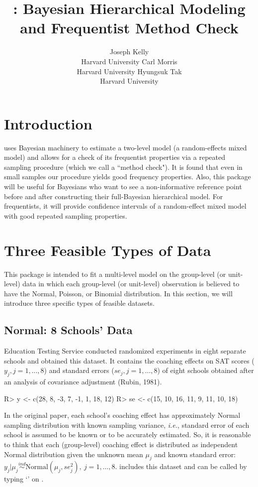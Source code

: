 \documentclass[article]{jss}
\author{Joseph Kelly\\Harvard University \And 
             Carl Morris\\ Harvard University\And
             Hyungsuk Tak\\Harvard University }
\title{\pkg{Rgbp}: Bayesian Hierarchical Modeling and Frequentist Method Check}
\begin{document}

\section[introduction]{Introduction}
 uses Bayesian machinery to estimate a two-level model (a random-effects mixed model) and allows for a check of its frequentist properties via a repeated sampling procedure (which we call a ``method check"). It is found that even in small samples our procedure yields good frequency properties. Also, this package will be useful for Bayesians who want to see a non-informative reference point before and after constructing their full-Bayesian hierarchical model. For frequentists, it will provide confidence intervals of a random-effect mixed model with good repeated sampling properties.

\section[Feasible Data Types]{Three Feasible Types of Data }
This package is intended to fit a multi-level model on the group-level (or unit-level) data in which each group-level (or unit-level) observation is believed to have the Normal, Poisson, or Binomial distribution. In this section, we will introduce three specific types of feasible datasets.

\subsection{Normal: 8 Schools' Data}
Education Testing Service conducted randomized experiments in eight separate schools and obtained this dataset. It contains the coaching effects on SAT scores ($y_{j}, j=1, \ldots, 8$) and standard errors ($se_{j}, j=1, \ldots, 8$) of eight schools obtained after an analysis of covariance adjustment (Rubin, 1981).
\begin{CodeChunk}
\begin{CodeInput}
R> y  <- c(28,  8, -3,  7, -1,  1, 18, 12)
R> se <- c(15, 10, 16, 11,  9, 11, 10, 18)
\end{CodeInput}
\end{CodeChunk}

In the original paper, each school's coaching effect has approximately Normal sampling distribution with known sampling variance, \emph{i.e.}, standard error of each school is assumed to be known or to be accurately estimated. So, it is reasonable to think that each (group-level) coaching effect is distributed as independent Normal distribution given the unknown mean $\mu_{j}$ and known standard error:  $y_{j}\vert\mu_{j}\stackrel{ind}{\sim} \textrm{Normal}(\mu_{j}, se^{2}_{j}),~ j=1, \ldots, 8$.  includes this dataset and can be called by typing `' on .
\end{document}

